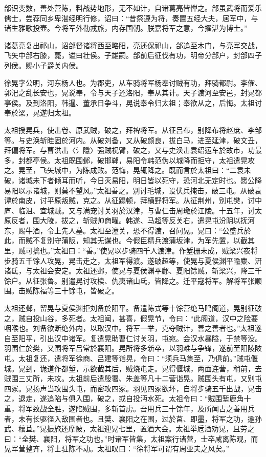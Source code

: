 \documentclass[12pt,UTF8]{ctexbook}
\begin{document}
郃识变数，善处营陈，料战势地形，无不如计，自诸葛亮皆惮之。郃虽武将而爱乐儒士，尝荐同乡卑湛经明行修，诏曰：“昔祭遵为将，奏置五经大夫，居军中，与诸生雅歌投壶。今将军外勒戎旅，内存国朝。朕嘉将军之意，今擢湛为博士。”

诸葛亮复出祁山，诏郃督诸将西至略阳，亮还保祁山，郃追至木门，与亮军交战，飞矢中郃右膝，薨，谥曰壮侯。子雄嗣。郃前后征伐有功，明帝分郃户，封郃四子列侯。赐小子爵关内侯。

徐晃字公明，河东杨人也。为郡吏，从车骑将军杨奉讨贼有功，拜骑都尉。李傕、郭汜之乱长安也，晃说奉，令与天子还洛阳，奉从其计。天子渡河至安邑，封晃都亭侯。及到洛阳，韩暹、董承日争斗，晃说奉令归太祖；奉欲从之，后悔。太祖讨奉於梁，晃遂归太祖。

太祖授晃兵，使击卷、原武贼，破之，拜裨将军。从征吕布，别降布将赵庶、李邹等。与史涣斩眭固於河内。从破刘备，又从破颜良，拔白马，进至延津，破文丑，拜偏将军。与曹洪击〈氵隱〉强贼祝臂，破之，又与史涣击袁绍运车於故市，功最多，封都亭侯。太祖既围邺，破邯郸，易阳令韩范伪以城降而拒守，太祖遣晃攻之。晃至，飞矢城中，为陈成败。范悔，晃辄降之。既而言於太祖曰：“二袁未破，诸城未下者倾耳而听，今日灭易阳，明日皆以死守，恐河北无定时也。愿公降易阳以示诸城，则莫不望风。”太祖善之。别讨毛城，设伏兵掩击，破三屯。从破袁谭於南皮，讨平原叛贼，克之。从征蹋顿，拜横野将军。从征荆州，别屯樊，讨中庐、临沮、宜城贼。又与满宠讨关羽於汉津，与曹仁击周瑜於江陵。十五年，讨太原反者，围大陵，拔之，斩贼帅商曜。韩遂、马超等反关右，遣晃屯汾阴以抚河东，赐牛酒，令上先人墓。太祖至潼关，恐不得渡，召问晃。晃曰：“公盛兵於此，而贼不复别守蒲阪，知其无谋也。今假臣精兵渡蒲坂津，为军先置，以截其里，贼可擒也。”太祖曰：“善。”使晃以步骑四千人渡津。作堑栅未成，贼梁兴夜将步骑五千馀人攻晃，晃击走之，太祖军得渡。遂破超等，使晃与夏侯渊平隃麋、汧诸氐，与太祖会安定。太祖还邺，使晃与夏侯渊平鄜、夏阳馀贼，斩梁兴，降三千馀户。从征张鲁。别遣晃讨攻椟、仇夷诸山氐，皆降之。迁平寇将军。解将军张顺围。击贼陈福等三十馀屯，皆破之。

太祖还邺，留晃与夏侯渊拒刘备於阳平。备遣陈式等十馀营绝马鸣阁道，晃别征破之，贼自投山谷，多死者。太祖闻，甚喜，假晃节，令曰：“此阁道，汉中之险要咽喉也。刘备欲断绝外内，以取汉中。将军一举，克夺贼计，善之善者也。”太祖遂自至阳平，引出汉中诸军。复遣晃助曹仁讨关羽，屯宛。会汉水暴隘，于禁等没。羽围仁於樊，又围将军吕常於襄阳。晃所将多新卒，以羽难与争锋，遂前至阳陵陂屯。太祖复还，遣将军徐商、吕建等诣晃，令曰：“须兵马集至，乃俱前。”贼屯偃城。晃到，诡道作都堑，示欲截其后，贼烧屯走。晃得偃城，两面连营，稍前，去贼围三丈所，未攻。太祖前后遣殷署、朱盖等凡十二营诣晃。贼围头有屯，又别屯四冢。晃扬声当攻围头屯，而密攻四冢。羽见四冢欲坏，自将步骑五千出战，晃击之，退走，遂追陷与俱入围，破之，或自投沔水死。太祖令曰：“贼围堑鹿角十重，将军致战全胜，遂陷贼围，多斩首虏。吾用兵三十馀年，及所闻古之善用兵者，未有长驱径入敌围者也。且樊、襄阳之在围，过於莒、即墨，将军之功，逾孙武、穰苴。”晃振旅还摩陂，太祖迎晃七里，置酒大会。太祖举卮酒劝晃，且劳之曰：“全樊、襄阳，将军之功也。”时诸军皆集，太祖案行诸营，士卒咸离陈观，而晃军营整齐，将士驻陈不动。太祖叹曰：“徐将军可谓有周亚夫之风矣。”
\end{document}
